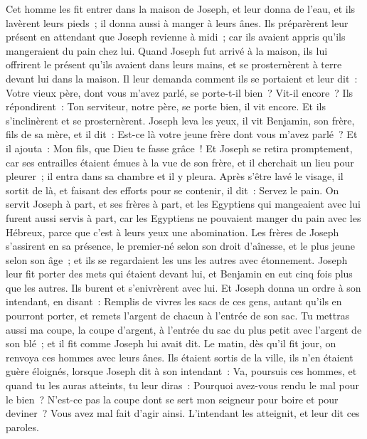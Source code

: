 \begin{multicols}{2}
Cet homme les fit entrer dans la maison de Joseph, et leur donna de l'eau, et ils lavèrent leurs pieds~; il donna aussi à manger à leurs ânes.
Ils préparèrent leur présent en attendant que Joseph revienne à midi~; car ils avaient appris qu'ils mangeraient du pain chez lui.
Quand Joseph fut arrivé à la maison, ils lui offrirent le présent qu'ils avaient dans leurs mains, et se prosternèrent à terre devant lui dans la maison.
Il leur demanda comment ils se portaient et leur dit~: Votre vieux père, dont vous m'avez parlé, se porte-t-il bien~? Vit-il encore~?
Ils répondirent~: Ton serviteur, notre père, se porte bien, il vit encore. Et ils s'inclinèrent et se prosternèrent.
Joseph leva les yeux, il vit Benjamin, son frère, fils de sa mère, et il dit~: Est-ce là votre jeune frère dont vous m'avez parlé~? Et il ajouta~: Mon fils, que Dieu te fasse grâce~!
Et Joseph se retira promptement, car ses entrailles étaient émues à la vue de son frère, et il cherchait un lieu pour pleurer~; il entra dans sa chambre et il y pleura.
Après s'être lavé le visage, il sortit de là, et faisant des efforts pour se contenir, il dit~: Servez le pain.
On servit Joseph à part, et ses frères à part, et les Egyptiens qui mangeaient avec lui furent aussi servis à part, car les Egyptiens ne pouvaient manger du pain avec les Hébreux, parce que c'est à leurs yeux une abomination.
Les frères de Joseph s'assirent en sa présence, le premier-né selon son droit d'aînesse, et le plus jeune selon son âge~; et ils se regardaient les uns les autres avec étonnement.
Joseph leur fit porter des mets qui étaient devant lui, et Benjamin en eut cinq fois plus que les autres. Ils burent et s'enivrèrent avec lui.
\VerseOne{}Et Joseph donna un ordre à son intendant, en disant~: Remplis de vivres les sacs de ces gens, autant qu'ils en pourront porter, et remets l'argent de chacun à l'entrée de son sac.
Tu mettras aussi ma coupe, la coupe d'argent, à l'entrée du sac du plus petit avec l'argent de son blé~; et il fit comme Joseph lui avait dit.
Le matin, dès qu'il fit jour, on renvoya ces hommes avec leurs ânes.
Ils étaient sortis de la ville, ils n'en étaient guère éloignés, lorsque Joseph dit à son intendant~: Va, poursuis ces hommes, et quand tu les auras atteints, tu leur diras~: Pourquoi avez-vous rendu le mal pour le bien~?
N'est-ce pas la coupe dont se sert mon seigneur pour boire et pour deviner~? Vous avez mal fait d'agir ainsi.
L'intendant les atteignit, et leur dit ces paroles.

\end{multicols}
